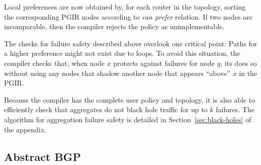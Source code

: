 Local preferences are now obtained by, for each router in the topology, sorting the corresponding PGIR nodes according to \textit{can prefer} relation. If two nodes are incomparable, then the compiler rejects the policy as unimplementable.


The checks for failure safety described above overlook one critical point: Paths for a higher preference might not exist due to loops. To avoid this situation, the compiler checks that, when node $x$ protects against failures for node $y$, its does so without using any nodes that shadow another node that appears ``above'' $x$ in the PGIR. 

Because the \sysname compiler has the complete user policy and topology, it is also able to efficiently check that aggregates do not black hole traffic for up to $k$ failures. The algorithm for aggregation failure safety is detailed in Section~\ref{sec:black-holes} of the appendix.
\subsection{Abstract BGP}


\newcommand{\highlight}[1]{%
  \colorbox{red!50}{$\displaystyle#1$}}
\newcommand{\Router}[1]{\KW{Router} #1:}
\newcommand{\REGEX}[1]{\texttt{regex}(#1)}
\newcommand{\PEER}{\texttt{peer}}
\newcommand{\COMM}{\texttt{comm}}
\newcommand{\MED}{\texttt{MED}}
\newcommand{\Arrow}{\ensuremath{\leftarrow}}


